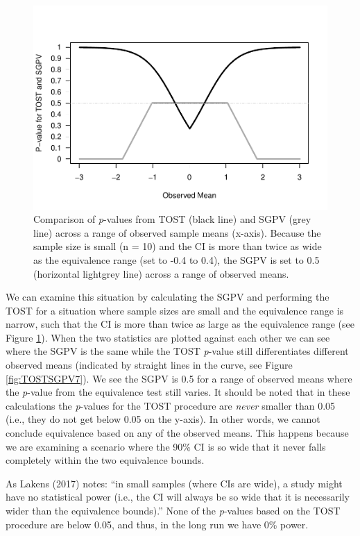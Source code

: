 \documentclass[,man,floatsintext]{apa6}
\begin{document}
\begin{figure}
\centering
\includegraphics{manuscript.R2_files/figure-latex/TOSTSGPV6-1.pdf}
\caption{\label{fig:TOSTSGPV6}Comparison of \emph{p}-values from TOST (black line) and SGPV (grey line) across a range of observed sample means (x-axis). Because the sample size is small (n = 10) and the CI is more than twice as wide as the equivalence range (set to -0.4 to 0.4), the SGPV is set to 0.5 (horizontal lightgrey line) across a range of observed means.}
\end{figure}

We can examine this situation by calculating the SGPV and performing the TOST for a situation where sample sizes are small and the equivalence range is narrow, such that the CI is more than twice as large as the equivalence range (see Figure \ref{fig:TOSTSGPV6}). When the two statistics are plotted against each other we can see where the SGPV is the same while the TOST \emph{p}-value still differentiates different observed means (indicated by straight lines in the curve, see Figure \ref{fig:TOSTSGPV7}). We see the SGPV is 0.5 for a range of observed means where the \emph{p}-value from the equivalence test still varies. It should be noted that in these calculations the \emph{p}-values for the TOST procedure are \emph{never} smaller than 0.05 (i.e., they do not get below 0.05 on the y-axis). In other words, we cannot conclude equivalence based on any of the observed means. This happens because we are examining a scenario where the 90\% CI is so wide that it never falls completely within the two equivalence bounds.

As Lakens (2017) notes: \enquote{in small samples (where CIs are wide), a study might have no statistical power (i.e., the CI will always be so wide that it is necessarily wider than the equivalence bounds).} None of the \emph{p}-values based on the TOST procedure are below 0.05, and thus, in the long run we have 0\% power.
\end{document}
